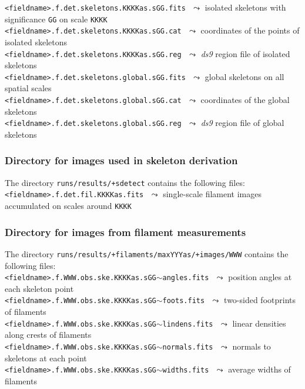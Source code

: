 \documentclass[a4paper,10pt]{article}
\begin{document}
\vspace{-2mm}\noindent
{\small\verb!<fieldname>.f.det.skeletons.KKKKas.sGG.fits!} $\,\,\leadsto$ isolated skeletons with significance \verb!GG! on scale \verb!KKKK!\\
{\small\verb!<fieldname>.f.det.skeletons.KKKKas.sGG.cat!} $\,\,\leadsto$ coordinates of the points of isolated skeletons\\
{\small\verb!<fieldname>.f.det.skeletons.KKKKas.sGG.reg!} $\,\,\leadsto$ \textsl{ds9} region file of isolated skeletons\\
{\small\verb!<fieldname>.f.det.skeletons.global.sGG.fits!} $\,\,\leadsto$ global skeletons on all spatial scales\\
{\small\verb!<fieldname>.f.det.skeletons.global.sGG.cat!} $\,\,\leadsto$ coordinates of the global skeletons\\
{\small\verb!<fieldname>.f.det.skeletons.global.sGG.reg!} $\,\,\leadsto$ \textsl{ds9} region file of global skeletons

\subsubsection{Directory for images used in skeleton derivation}
\label{sdetect}

The directory \verb!runs/results/+sdetect! contains the following files:\\

\vspace{-2mm}\noindent
{\small\verb!<fieldname>.f.det.fil.KKKKas.fits!} $\,\,\leadsto$ single-scale filament images accumulated on scales around \verb!KKKK!

\subsubsection{Directory for images from filament measurements}
\label{filimages}

The directory \verb!runs/results/+filaments/maxYYYas/+images/WWW! contains the following files:\\

\vspace{-2mm}\noindent
{\small\verb!<fieldname>.f.WWW.obs.ske.KKKKas.sGG!$\sim$\verb!angles.fits!} $\,\,\leadsto$ position angles at each skeleton point\\
{\small\verb!<fieldname>.f.WWW.obs.ske.KKKKas.sGG!$\sim$\verb!foots.fits!} $\,\,\leadsto$ two-sided footprints of filaments\\
{\small\verb!<fieldname>.f.WWW.obs.ske.KKKKas.sGG!$\sim$\verb!lindens.fits!} $\,\,\leadsto$ linear densities along crests of filaments\\
{\small\verb!<fieldname>.f.WWW.obs.ske.KKKKas.sGG!$\sim$\verb!normals.fits!} $\,\,\leadsto$ normals to skeletons at each point\\
{\small\verb!<fieldname>.f.WWW.obs.ske.KKKKas.sGG!$\sim$\verb!widths.fits!} $\,\,\leadsto$ average widths of filaments
\end{document}
